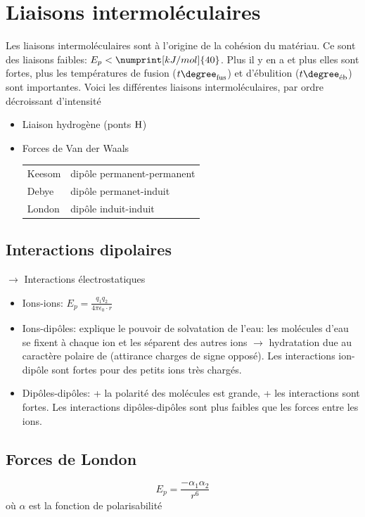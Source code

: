\documentclass[11pt,a4paper,french]{article}
\begin{document}
\section{Liaisons intermoléculaires}
Les liaisons intermoléculaires sont à l'origine de la cohésion du matériau.
Ce sont des liaisons faibles: $E_p<\numprint[kJ/mol]{40}$.
Plus il y en a et plus elles sont fortes, plus les températures de fusion ($t\degree_{\mathrm{fus}}$) et d'ébulition ($t\degree_{\textrm{éb}}$) sont importantes.
Voici les différentes liaisons intermoléculaires, par ordre décroissant d'intensité
\begin{itemize}
	\item Liaison hydrogène (ponts $\ce{H}$)
	\item Forces de Van der Waals
		\begin{center}
			\begin{tabular}{ll}
				Keesom & dipôle permanent-permanent\\
				Debye & dipôle permanet-induit\\
				London & dipôle induit-induit
			\end{tabular}
		\end{center}
\end{itemize}

\subsection{Interactions dipolaires}
$\rightarrow$ Interactions électrostatiques
\begin{itemize}
	\item Ions-ions: $E_p=\frac{q_1q_2}{4\pi\epsilon_0\cdot r}$
	\item Ions-dipôles: explique le pouvoir de solvatation de l'eau: les molécules d'eau se fixent à chaque ion et les séparent des autres ions $\rightarrow$ hydratation due au caractère polaire de  (attirance charges de signe opposé).
		Les interactions ion-dipôle sont fortes pour des petits ions très chargés.
	\item Dipôles-dipôles: + la polarité des molécules est grande, + les interactions sont fortes.
		Les interactions dipôles-dipôles sont plus faibles que les forces entre les ions.
\end{itemize}

\subsection{Forces de London}
\[ E_p = \frac{-\alpha_1 \alpha_2}{r^6} \]
où $\alpha$ est la fonction de polarisabilité
\end{document}
